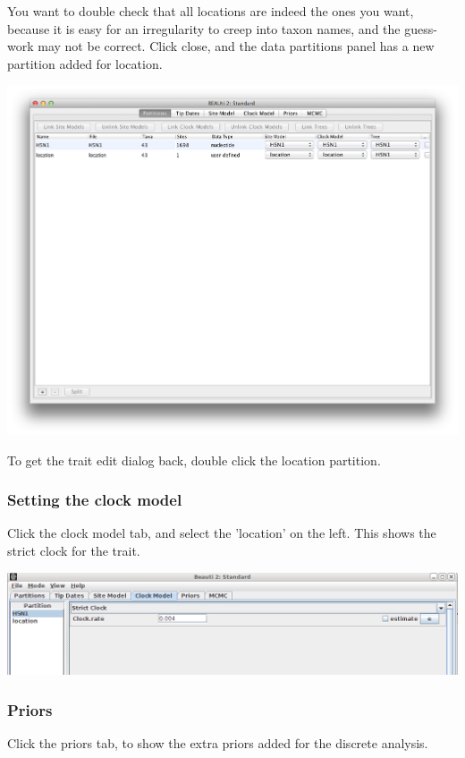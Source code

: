 \documentclass{article}
\begin{document}
You want to double check that all locations are indeed the ones you want, because it is easy for an irregularity to creep into taxon names, and the guess-work may not be correct.
Click close, and the data partitions panel has a new partition added for location.

\includegraphics[scale=0.4]{figures/BEAUti_DataPartitions2.png}

To get the trait edit dialog back, double click the location partition.

\subsubsection*{Setting the clock model}

Click the clock model tab, and select the 'location' on the left.
This shows the strict clock for the trait.

\includegraphics[scale=0.4,clip=true,trim=0 300 0 0]{figures/BEAUti_clockmodel2.png}

\subsubsection*{Priors}

Click the priors tab, to show the extra priors added for the discrete analysis.
\end{document}
